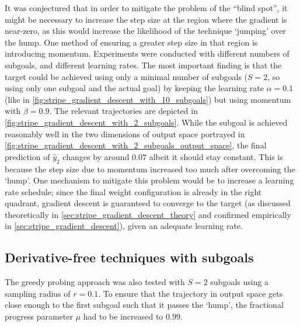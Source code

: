 It was conjectured that in order to mitigate the problem of the ``blind spot'', it might be necessary to increase the step size at the region where the gradient is near-zero, as this would increase the likelihood of the technique `jumping' over the hump.
One method of ensuring a greater step size in that region is introducing momentum.
Experiments were conducted with different numbers of subgoals, and different learning rates.
The most important finding is that the target could be achieved using only a minimal number of subgoals ($S=2$, so using only one subgoal and the actual goal) by keeping the learning rate $\alpha=0.1$ (like in \ref{fig:stripe_gradient_descent_with_10_subgoals}) but using momentum with $\beta=0.9$.
The relevant trajectories are depicted in \ref{fig:stripe_gradient_descent_with_2_subgoals}.
While the subgoal is achieved reasonably well in the two dimensions of output space portrayed in \ref{fig:stripe_gradient_descent_with_2_subgoals_output_space}, the final prediction of $\hat{y}_2$ changes by around $0.07$ albeit it should stay constant.
This is because the step size due to momentum increased too much after overcoming the `hump'.
One mechanism to mitigate this problem would be to increase a learning rate schedule; since the final weight configuration is already in the right quadrant, gradient descent is guaranteed to converge to the target (as discussed theoretically in \ref{sec:stripe_gradient_descent_theory} and confirmed empirically in \ref{sec:stripe_gradient_descent}), given an adequate learning rate.

\subsection{Derivative-free techniques with subgoals}
\label{sec:stripe_derivative_free_subgoals}
The greedy probing approach was also tested with $S=2$ subgoals using a sampling radius of $r=0.1$.
To ensure that the trajectory in output space gets close enough to the first subgoal such that it passes the `hump', the fractional progress parameter $\mu$ had to be increased to $0.99$.

